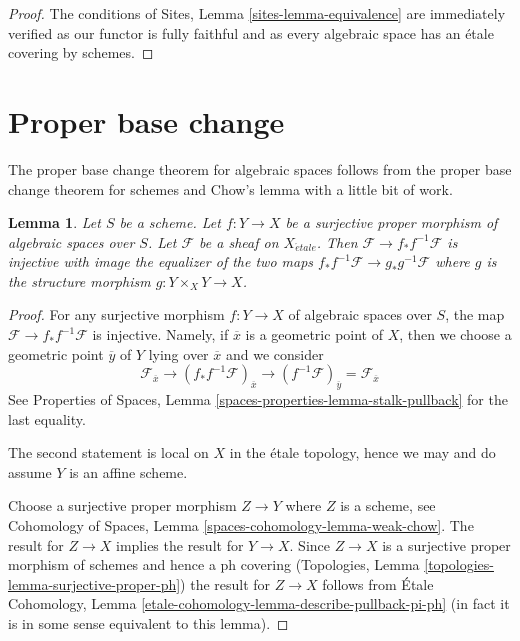 \documentclass{stacks-project}
\theoremstyle{plain}
\newtheorem{lemma}[subsection]{Lemma}
\theoremstyle{definition}
\theoremstyle{remark}
\numberwithin{equation}{subsection}
\def\etale{{\acute{e}tale}}
\begin{document}
\begin{proof}
The conditions of Sites, Lemma \ref{sites-lemma-equivalence}
are immediately verified as our functor is fully faithful
and as every algebraic space has an \'etale covering by schemes.
\end{proof}







\section{Proper base change}
\label{section-proper-base-change}

\noindent
The proper base change theorem for algebraic spaces follows from
the proper base change theorem for schemes and Chow's lemma
with a little bit of work.

\begin{lemma}
\label{lemma-surjective-proper}
Let $S$ be a scheme. Let $f : Y \to X$ be a surjective proper morphism
of algebraic spaces over $S$. Let $\mathcal{F}$ be a sheaf on $X_\etale$.
Then $\mathcal{F} \to f_*f^{-1}\mathcal{F}$ is injective with
image the equalizer of the two maps
$f_*f^{-1}\mathcal{F} \to g_*g^{-1}\mathcal{F}$ where
$g$ is the structure morphism $g : Y \times_X Y \to X$.
\end{lemma}

\begin{proof}
For any surjective morphism $f : Y \to X$ of algebraic spaces over $S$,
the map $\mathcal{F} \to f_*f^{-1}\mathcal{F}$ is injective.
Namely, if $\overline{x}$ is a geometric point of $X$, then we
choose a geometric point $\overline{y}$ of $Y$ lying over $\overline{x}$
and we consider
$$
\mathcal{F}_{\overline{x}} \to
(f_*f^{-1}\mathcal{F})_{\overline{x}} \to
(f^{-1}\mathcal{F})_{\overline{y}} = \mathcal{F}_{\overline{x}}
$$
See Properties of Spaces, Lemma \ref{spaces-properties-lemma-stalk-pullback}
for the last equality.

\medskip\noindent
The second statement is local on $X$ in the \'etale topology, hence we may
and do assume $Y$ is an affine scheme.

\medskip\noindent
Choose a surjective proper morphism $Z \to Y$ where $Z$ is a scheme, see
Cohomology of Spaces, Lemma \ref{spaces-cohomology-lemma-weak-chow}.
The result for $Z \to X$ implies the result for $Y \to X$.
Since $Z \to X$ is a surjective proper morphism of schemes
and hence a ph covering
(Topologies, Lemma \ref{topologies-lemma-surjective-proper-ph})
the result for $Z \to X$ follows from
\'Etale Cohomology, Lemma \ref{etale-cohomology-lemma-describe-pullback-pi-ph}
(in fact it is in some sense equivalent to this lemma).
\end{proof}
\end{document}
